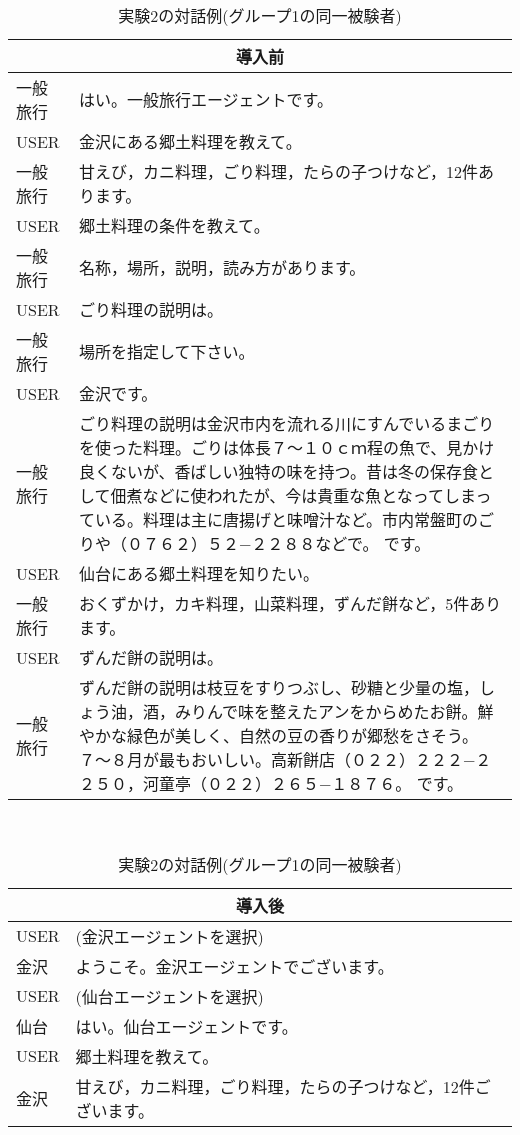 \begin{table}[htp] 
\caption{実験2の対話例(グループ1の同一被験者)}\label{tab:ex2ex}
\bigskip\centering\footnotesize\tt

\begin{tabular}[t]{lp{50mm}}
\multicolumn{2}{c}{導入前}\\
\hline\hline
一般旅行&	はい。一般旅行エージェントです。\\
USER&	金沢にある郷土料理を教えて。\\
一般旅行&	甘えび，カニ料理，ごり料理，たらの子つけなど，12件あります。\\
USER&	郷土料理の条件を教えて。\\
一般旅行&	名称，場所，説明，読み方があります。\\
USER&	ごり料理の説明は。\\
一般旅行&	場所を指定して下さい。\\
USER&	金沢です。\\
一般旅行&	ごり料理の説明は金沢市内を流れる川にすんでいるまごりを使った料理。ごりは体長７〜１０ｃｍ程の魚で、見かけ良くないが、香ばしい独特の味を持つ。昔は冬の保存食として佃煮などに使われたが、今は貴重な魚となってしまっている。料理は主に唐揚げと味噌汁など。市内常盤町のごりや（０７６２）５２−２２８８などで。
です。\\
USER&	仙台にある郷土料理を知りたい。\\
一般旅行&	おくずかけ，カキ料理，山菜料理，ずんだ餅など，5件あります。\\
USER&	ずんだ餅の説明は。\\
一般旅行&	ずんだ餅の説明は枝豆をすりつぶし、砂糖と少量の塩，しょう油，酒，みりんで味を整えたアンをからめたお餅。鮮やかな緑色が美しく、自然の豆の香りが郷愁をさそう。７〜８月が最もおいしい。高新餅店（０２２）２２２−２２５０，河童亭（０２２）２６５−１８７６。
です。\\
\hline\hline
\end{tabular}　
\begin{tabular}[t]{lp{50mm}}
\multicolumn{2}{c}{導入後}\\
\hline\hline
USER& (金沢エージェントを選択)\\
金沢&	ようこそ。金沢エージェントでございます。\\
USER& (仙台エージェントを選択)\\
仙台&	はい。仙台エージェントです。\\
USER&	郷土料理を教えて。\\
金沢&	甘えび，カニ料理，ごり料理，たらの子つけなど，12件ございます。\\

\end{tabular}
\end{table}
